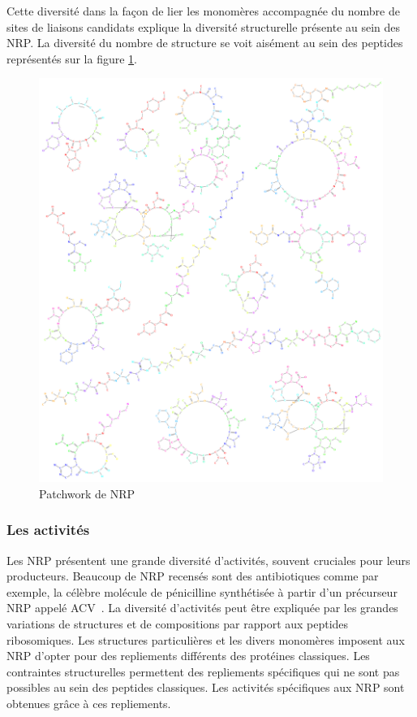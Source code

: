 Cette diversité dans la façon de lier les monomères accompagnée du nombre de sites de liaisons candidats explique la diversité structurelle présente au sein des NRP.
La diversité du nombre de structure se voit aisément au sein des peptides représentés sur la figure \ref{peps_example}.

\begin{figure}[h!]
  \begin{center}
    \includegraphics[width=450px]{Figures/bio/Intro/NRPs/peps.png}
    \caption{\label{peps_example}Patchwork de NRP}
  \end{center}
\end{figure}


\subsubsection{Les activités}

Les NRP présentent une grande diversité d'activités, souvent cruciales pour leurs producteurs.
Beaucoup de NRP recensés sont des antibiotiques comme par exemple, la célèbre molécule de pénicilline synthétisée à partir d'un précurseur NRP appelé ACV~\cite{queener_molecular_1990}.
La diversité d'activités peut être expliquée par les grandes variations de structures et de compositions par rapport aux peptides ribosomiques.
Les structures particulières et les divers monomères imposent aux NRP d'opter pour des repliements différents des protéines classiques.
Les contraintes structurelles permettent des repliements spécifiques qui ne sont pas possibles au sein des peptides classiques.
Les activités spécifiques aux NRP sont obtenues grâce à ces repliements.

